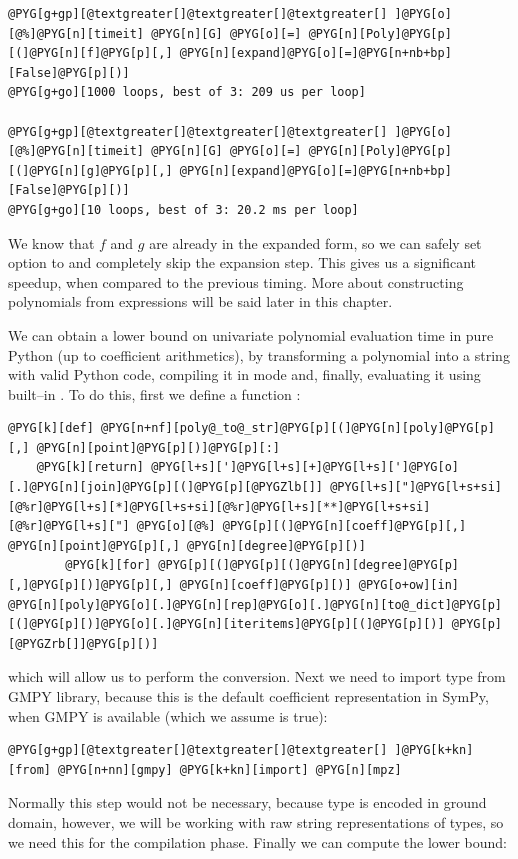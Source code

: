 \begin{Verbatim}[commandchars=@\[\]]
@PYG[g+gp][@textgreater[]@textgreater[]@textgreater[] ]@PYG[o][@%]@PYG[n][timeit] @PYG[n][G] @PYG[o][=] @PYG[n][Poly]@PYG[p][(]@PYG[n][f]@PYG[p][,] @PYG[n][expand]@PYG[o][=]@PYG[n+nb+bp][False]@PYG[p][)]
@PYG[g+go][1000 loops, best of 3: 209 us per loop]

@PYG[g+gp][@textgreater[]@textgreater[]@textgreater[] ]@PYG[o][@%]@PYG[n][timeit] @PYG[n][G] @PYG[o][=] @PYG[n][Poly]@PYG[p][(]@PYG[n][g]@PYG[p][,] @PYG[n][expand]@PYG[o][=]@PYG[n+nb+bp][False]@PYG[p][)]
@PYG[g+go][10 loops, best of 3: 20.2 ms per loop]
\end{Verbatim}
\noindent
We know that $f$ and $g$ are already in the expanded form, so we can safely set 
option to  and completely skip the expansion step. This gives us a significant
speedup, when compared to the previous timing. More about constructing polynomials from
expressions will be said later in this chapter.

We can obtain a lower bound on univariate polynomial evaluation time in pure Python (up to
coefficient arithmetics), by transforming a polynomial into a string with valid Python code,
compiling it in  mode and, finally, evaluating it using built--in \href{http://docs.python.org/library/functions.html\#eval}{}. To
do this, first we define a function :

\begin{Verbatim}[commandchars=@\[\]]
@PYG[k][def] @PYG[n+nf][poly@_to@_str]@PYG[p][(]@PYG[n][poly]@PYG[p][,] @PYG[n][point]@PYG[p][)]@PYG[p][:]
    @PYG[k][return] @PYG[l+s][']@PYG[l+s][+]@PYG[l+s][']@PYG[o][.]@PYG[n][join]@PYG[p][(]@PYG[p][@PYGZlb[]] @PYG[l+s]["]@PYG[l+s+si][@%r]@PYG[l+s][*]@PYG[l+s+si][@%r]@PYG[l+s][**]@PYG[l+s+si][@%r]@PYG[l+s]["] @PYG[o][@%] @PYG[p][(]@PYG[n][coeff]@PYG[p][,] @PYG[n][point]@PYG[p][,] @PYG[n][degree]@PYG[p][)]
        @PYG[k][for] @PYG[p][(]@PYG[p][(]@PYG[n][degree]@PYG[p][,]@PYG[p][)]@PYG[p][,] @PYG[n][coeff]@PYG[p][)] @PYG[o+ow][in] @PYG[n][poly]@PYG[o][.]@PYG[n][rep]@PYG[o][.]@PYG[n][to@_dict]@PYG[p][(]@PYG[p][)]@PYG[o][.]@PYG[n][iteritems]@PYG[p][(]@PYG[p][)] @PYG[p][@PYGZrb[]]@PYG[p][)]
\end{Verbatim}
\noindent
which will allow us to perform the conversion. Next we need to import  type from
GMPY library, because this is the default coefficient representation in SymPy, when GMPY
is available (which we assume is true):

\begin{Verbatim}[commandchars=@\[\]]
@PYG[g+gp][@textgreater[]@textgreater[]@textgreater[] ]@PYG[k+kn][from] @PYG[n+nn][gmpy] @PYG[k+kn][import] @PYG[n][mpz]
\end{Verbatim}
\noindent
Normally this step would not be necessary, because  type is encoded in  ground
domain, however, we will be working with raw string representations of types, so we need this
for the compilation phase. Finally we can compute the lower bound:

